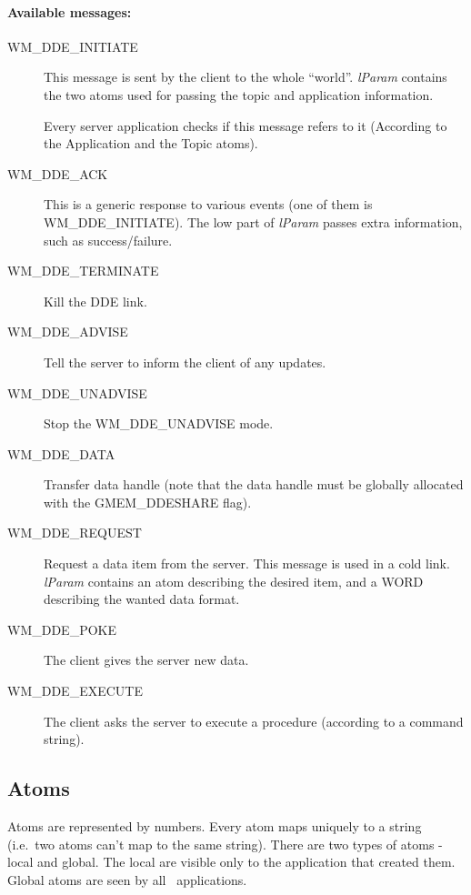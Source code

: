 \paragraph{Available messages:}
\begin{description}
  \item[WM\_DDE\_INITIATE]
    This message is sent by the client to the whole ``world''.
    {\em lParam}{} contains the two atoms used for passing the topic and
    application information.

    Every server application checks if this message refers to it
    (According to the Application and the Topic atoms).


  \item[WM\_DDE\_ACK]
    This is a generic response to various events
    (one of them is WM\_DDE\_INITIATE).
    The low part of {\em lParam}{} passes extra information, such as
    success/failure.

  \item[WM\_DDE\_TERMINATE]
    Kill the DDE link.


  \item[WM\_DDE\_ADVISE]
    Tell the server to inform the client of any updates.


  \item[WM\_DDE\_UNADVISE]
    Stop the WM\_DDE\_UNADVISE mode.


  \item[WM\_DDE\_DATA]
    Transfer data handle (note that the data handle must be globally allocated
    with the GMEM\_DDESHARE flag).

  \item[WM\_DDE\_REQUEST]
    Request a data item from the server. This message is used in a
    cold link. {\em lParam}{} contains an atom describing the desired
    item, and a WORD describing the wanted data format.
  \item[WM\_DDE\_POKE]
    The client gives the server new data.
  \item[WM\_DDE\_EXECUTE]
    The client asks the server to execute a procedure (according to a
    command string).

\end{description}

\subsection{Atoms}
\label{sec:WhatAreAtoms}
Atoms are represented by numbers. Every atom maps uniquely to a string
(i.e.\ two atoms can't map to the same string).
There are two types of atoms - local and global. The local are visible
only to the application that created them. Global atoms are seen by all
\windoz\  applications.

